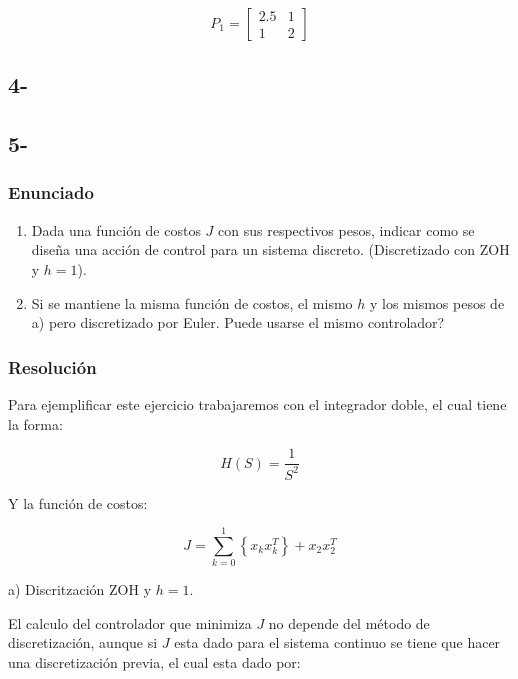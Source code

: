 \begin{equation}
    P_1 = \begin{bmatrix}
        2.5 & 1 \\ 
        1 & 2 
    \end{bmatrix}    
\end{equation}

\subsection*{4-}


\subsection*{5-}

\subsubsection*{Enunciado}

\begin{enumerate}
    \item Dada una función de costos $J$ con sus respectivos pesos, indicar como se diseña una acción de control para un sistema discreto. (Discretizado con ZOH y $h=1$).
    \item Si se mantiene la misma función de costos, el mismo $h$ y los mismos pesos de a) pero discretizado por Euler. Puede usarse el mismo controlador?
\end{enumerate}

\subsubsection*{Resolución}

Para ejemplificar este ejercicio trabajaremos con el integrador doble, el cual tiene la forma: 

\begin{equation}
    H(S) = \frac{1}{S^2}
\end{equation}

Y la función de costos: 

\begin{equation}
    J = \sum_{k=0}^{1} \left\{x_k x_k^T \right\} + x_2 x_2^T
\end{equation}

a) Discritzación ZOH y $h=1$.

El calculo del controlador que minimiza $J$ no depende del método de discretización, aunque si $J$ esta dado para el sistema continuo se tiene que 
hacer una discretización previa, el cual esta dado por: 

